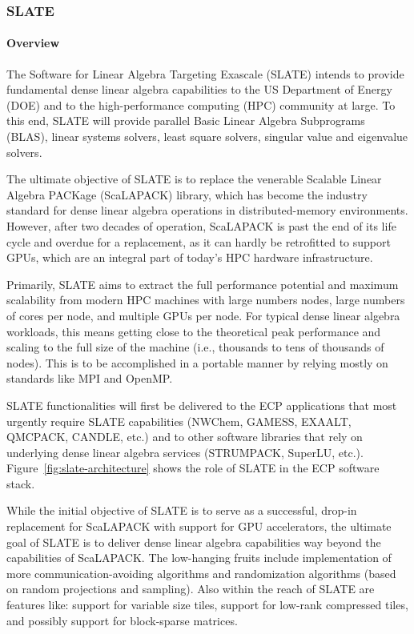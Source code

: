 \subsubsection{ SLATE}\label{subsubsect:slate}


\paragraph{Overview}

The Software for Linear Algebra Targeting Exascale (SLATE) intends to
provide fundamental dense linear algebra capabilities
to the US Department of Energy (DOE)
and to the high-performance computing (HPC) community at large.
To this end, SLATE will provide
parallel Basic Linear Algebra Subprograms (BLAS),
linear systems solvers, least square solvers,
singular value and eigenvalue solvers.

The ultimate objective of SLATE is to replace the
venerable Scalable Linear Algebra PACKage (ScaLAPACK) library,
which has become the industry standard for dense linear algebra operations
in distributed-memory environments.
However, after two decades of operation,
ScaLAPACK is past the end of its life cycle and overdue for a replacement,
as it can hardly be retrofitted to support GPUs,
which are an integral part of today's HPC hardware infrastructure.

Primarily, SLATE aims to extract the full performance potential and maximum
scalability from modern HPC machines with large numbers nodes,
large numbers of cores per node, and multiple GPUs per node.
For typical dense linear algebra workloads, this means getting close
to the theoretical peak performance and scaling to the full size of the machine
(i.e., thousands to tens of thousands of nodes).
This is to be accomplished in a portable manner by relying mostly on standards
like MPI and OpenMP.

SLATE functionalities will first be delivered to the ECP applications
that most urgently require SLATE capabilities
(NWChem, GAMESS, EXAALT, QMCPACK, CANDLE, etc.)
and to other software libraries
that rely on underlying dense linear algebra services
(STRUMPACK, SuperLU, etc.).
Figure~\ref{fig:slate-architecture} shows the role of SLATE
in the ECP software stack.

While the initial objective of SLATE is to serve as a successful,
drop-in replacement for ScaLAPACK with support for GPU accelerators,
the ultimate goal of SLATE is to deliver dense linear algebra capabilities
way beyond the capabilities of ScaLAPACK.
The low-hanging fruits include implementation of more communication-avoiding
algorithms and randomization algorithms
(based on random projections and sampling).
Also within the reach of SLATE are features like:
support for variable size tiles, support for low-rank compressed tiles,
and possibly support for block-sparse matrices.

